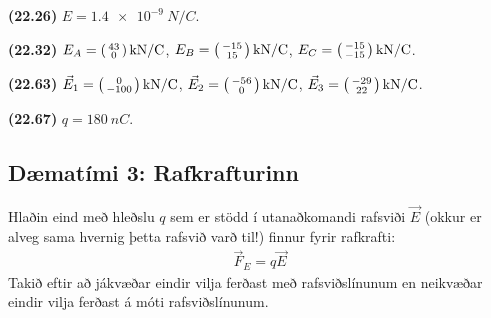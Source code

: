 \ifdefined \wholebook \else\documentclass[oneside]{book}\usepackage{EdlBook}\graphicspath{{figures/}}
\begin{document}
\begin{tcolorbox}
\begin{enumerate*}[label = \vspace{0.15cm} ]
  \item \textbf{(22.26)} $E = \SI{1.4e-9}{N/C}$.
  \item \textbf{(22.32)} $E_A = \smqty(43 \\ 0) \, \si{kN/C}$, $E_B = \smqty(-15 \\ 15) \, \si{kN/C}$, $E_C = \smqty(-15 \\ -15) \, \si{kN/C}$.
    \item \textbf{(22.63)} $\vec{E}_1 = \smqty(0 \\ -100) \, \si{kN/C}$, $\vec{E}_2 = \smqty(-56 \\ 0) \, \si{kN/C}$, $\vec{E}_3 = \smqty(-29 \\ 22) \, \si{kN/C}$.
  \item \textbf{(22.67)} $q = \SI{180}{nC}$.
\end{enumerate*}
\end{tcolorbox}

\newpage

\subsection*{Dæmatími 3: Rafkrafturinn}

\begin{tcolorbox}
Hlaðin eind með hleðslu $q$ sem er stödd í utanaðkomandi rafsviði $\vec{E}$ (okkur er alveg sama hvernig þetta rafsvið varð til!) finnur fyrir rafkrafti:
\begin{align*}
    \vec{F}_E = q \vec{E}
\end{align*}
Takið eftir að jákvæðar eindir vilja ferðast með rafsviðslínunum en neikvæðar eindir vilja ferðast á móti rafsviðslínunum.
\end{tcolorbox}
\end{document}
